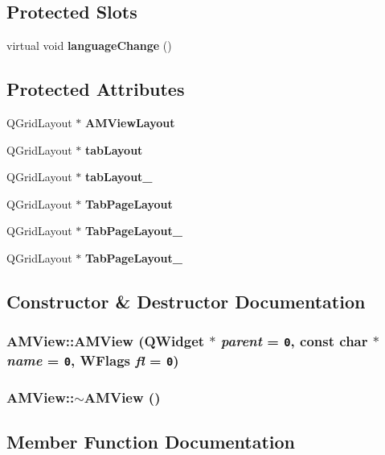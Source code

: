 \subsection*{Protected Slots}
\begin{CompactItemize}
\item 
virtual void {\bf language\-Change} ()
\end{CompactItemize}
\subsection*{Protected Attributes}
\begin{CompactItemize}
\item 
QGrid\-Layout $\ast$ {\bf AMView\-Layout}
\item 
QGrid\-Layout $\ast$ {\bf tab\-Layout}
\item 
QGrid\-Layout $\ast$ {\bf tab\-Layout\_}
\item 
QGrid\-Layout $\ast$ {\bf Tab\-Page\-Layout}
\item 
QGrid\-Layout $\ast$ {\bf Tab\-Page\-Layout\_}
\item 
QGrid\-Layout $\ast$ {\bf Tab\-Page\-Layout\_}
\end{CompactItemize}


\subsection{Constructor \& Destructor Documentation}
\subsubsection{\setlength{\rightskip}{0pt plus 5cm}AMView::AMView (QWidget $\ast$ {\em parent} = {\tt 0}, const char $\ast$ {\em name} = {\tt 0}, WFlags {\em fl} = {\tt 0})}\label{classAMView_418eaebe213e84b5a1acd0588afcc418}


\subsubsection{\setlength{\rightskip}{0pt plus 5cm}AMView::$\sim$AMView ()}\label{classAMView_a6c5f1081d126b4b61b299366facec42}




\subsection{Member Function Documentation}
